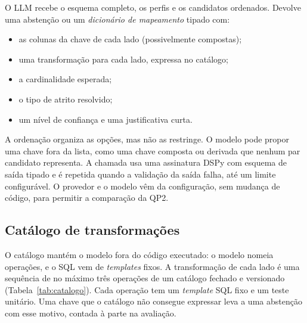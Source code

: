 O LLM recebe o esquema completo, os perfis e os candidatos ordenados. Devolve
uma abstenção ou um \emph{dicionário de mapeamento} tipado com:

\begin{itemize}
\item as colunas da chave de cada lado (possivelmente compostas);
\item uma transformação para cada lado, expressa no catálogo;
\item a cardinalidade esperada;
\item o tipo de atrito resolvido;
\item um nível de confiança e uma justificativa curta.
\end{itemize}

A ordenação organiza as opções, mas não as restringe. O modelo pode propor uma
chave fora da lista, como uma chave composta ou derivada que nenhum par
candidato representa. A chamada usa uma assinatura DSPy
\cite{khattab2024dspy} com esquema de saída tipado e é repetida quando a
validação da saída falha, até um limite configurável. O provedor e o modelo
vêm da configuração, sem mudança de código, para permitir a comparação da
QP2.

\subsection{Catálogo de transformações}
\label{sec:arquitetura-catalogo}

O catálogo mantém o modelo fora do código executado: o modelo nomeia
operações, e o SQL vem de \emph{templates} fixos. A transformação de cada lado
é uma sequência de no máximo três operações de um catálogo fechado e
versionado (Tabela~\ref{tab:catalogo}). Cada operação tem um \emph{template}
SQL fixo e um teste unitário. Uma chave que o catálogo não consegue
expressar leva a uma abstenção com esse motivo, contada à parte na
avaliação.

